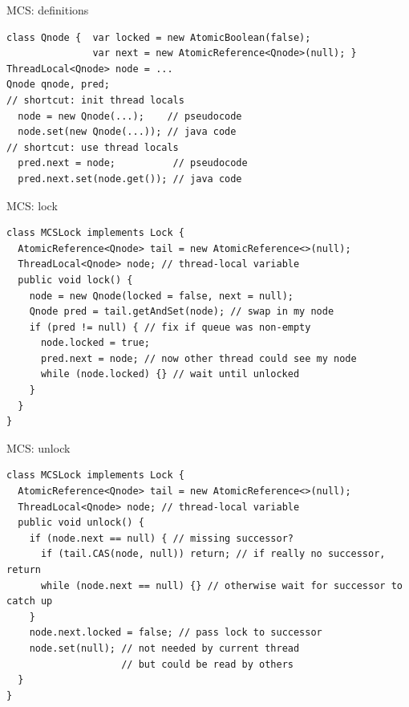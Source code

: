 \begin{frame}[t,fragile]{MCS: definitions}
\begin{verbatim}
class Qnode {  var locked = new AtomicBoolean(false); 
               var next = new AtomicReference<Qnode>(null); }
ThreadLocal<Qnode> node = ...
Qnode qnode, pred;
// shortcut: init thread locals
  node = new Qnode(...);    // pseudocode
  node.set(new Qnode(...)); // java code
// shortcut: use thread locals
  pred.next = node;          // pseudocode
  pred.next.set(node.get()); // java code
\end{verbatim}
\end{frame}


\begin{frame}[t,fragile]{MCS: lock}
\begin{verbatim}
class MCSLock implements Lock {
  AtomicReference<Qnode> tail = new AtomicReference<>(null);
  ThreadLocal<Qnode> node; // thread-local variable
  public void lock() {
    node = new Qnode(locked = false, next = null);    
    Qnode pred = tail.getAndSet(node); // swap in my node
    if (pred != null) { // fix if queue was non-empty
      node.locked = true;
      pred.next = node; // now other thread could see my node 
      while (node.locked) {} // wait until unlocked
    }
  }
}
\end{verbatim}
\end{frame}


\begin{frame}[t,fragile]{MCS: unlock}
\begin{verbatim}
class MCSLock implements Lock {
  AtomicReference<Qnode> tail = new AtomicReference<>(null);
  ThreadLocal<Qnode> node; // thread-local variable  
  public void unlock() {    
    if (node.next == null) { // missing successor?
      if (tail.CAS(node, null)) return; // if really no successor, return
      while (node.next == null) {} // otherwise wait for successor to catch up
    }
    node.next.locked = false; // pass lock to successor
    node.set(null); // not needed by current thread
                    // but could be read by others
  }
}
\end{verbatim}
\end{frame}

